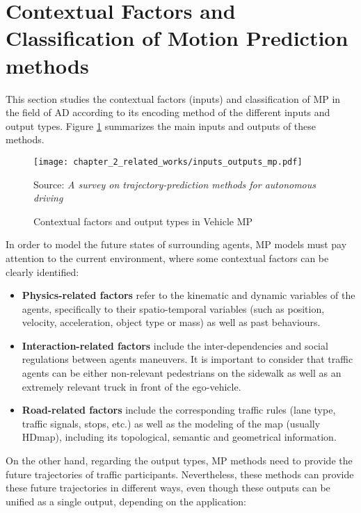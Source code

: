 \section{Contextual Factors and Classification of Motion Prediction methods}
\label{sec:2_contextual_factors_and_classification_mp}

This section studies the contextual factors (inputs) and classification of \ac{MP} in the field of \ac{AD} according to its encoding method of the different inputs and output types. Figure \ref{fig:chapter_2_related_works/input_output_mp} summarizes the main inputs and outputs of these methods. 

\begin{figure}[h]
	\centering
	\texttt{[image: chapter\_2\_related\_works/inputs\_outputs\_mp.pdf]}
	\caption{Contextual factors and output types in Vehicle \ac{MP}}
	Source: \textit{A survey on trajectory-prediction methods for autonomous driving} \cite{huang2022survey}
	\label{fig:chapter_2_related_works/input_output_mp}
\end{figure}

In order to model the future states of surrounding agents, \ac{MP} models must pay attention to the current environment, where some contextual factors can be clearly identified:

\begin{itemize}
	
	\item \textbf{Physics-related factors} refer to the kinematic and dynamic variables of the agents, specifically to their spatio-temporal variables (such as position, velocity, acceleration, object type or mass) as well as past behaviours. 
	
	\item \textbf{Interaction-related factors} include the inter-dependencies and social regulations between agents maneuvers. It is important to consider that traffic agents can be either non-relevant pedestrians on the sidewalk as well as an extremely relevant truck in front of the ego-vehicle.
	
	\item \textbf{Road-related factors} include the corresponding traffic rules (lane type, traffic signals, stops, etc.) as well as the modeling of the map (usually \ac{HDmap}), including its topological, semantic and geometrical information.
	
\end{itemize}

On the other hand, regarding the output types, \ac{MP} methods need to provide the future trajectories of traffic participants. Nevertheless, these methods can provide these future trajectories in different ways, even though these outputs can be unified as a single output, depending on the application:

